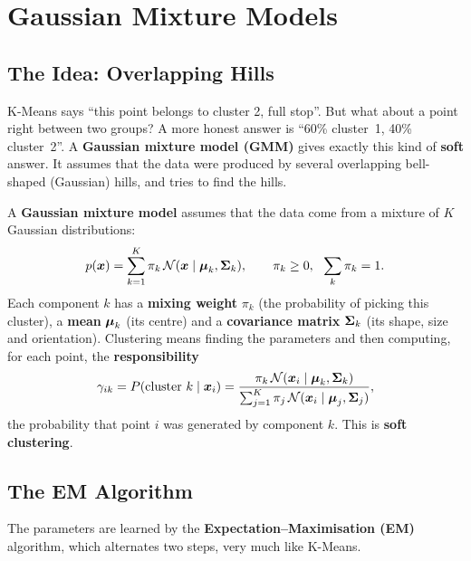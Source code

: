 \section{Gaussian Mixture Models}\label{sec:gmm}

\subsection{The Idea: Overlapping Hills}

K-Means says ``this point belongs to cluster 2, full stop''. But what about a point right between two groups? A more honest answer is ``60\% cluster~1, 40\% cluster~2''. A \textbf{Gaussian mixture model (GMM)} gives exactly this kind of \textbf{soft} answer. It assumes that the data were produced by several overlapping bell-shaped (Gaussian) hills, and tries to find the hills.

\begin{definition}
A \textbf{Gaussian mixture model} assumes that the data come from a mixture of $K$ Gaussian distributions:
\[
  p(\vect x)=\sum_{k=1}^{K}\pi_k\,\mathcal N(\vect x\mid\vect\mu_k,\vect\Sigma_k),\qquad \pi_k\ge0,\ \ \sum_k\pi_k=1.
\]
Each component $k$ has a \textbf{mixing weight} $\pi_k$ (the probability of picking this cluster), a \textbf{mean} $\boldsymbol{\mu}_k$ (its centre) and a \textbf{covariance matrix} $\boldsymbol{\Sigma}_k$ (its shape, size and orientation). Clustering means finding the parameters and then computing, for each point, the \textbf{responsibility}
\[
  \gamma_{ik}=P(\text{cluster }k\mid\boldsymbol{x}_i)=\frac{\pi_k\,\mathcal N(\boldsymbol{x}_i\mid\boldsymbol{\mu}_k,\boldsymbol{\Sigma}_k)}{\sum_{j=1}^{K}\pi_j\,\mathcal N(\boldsymbol{x}_i\mid\boldsymbol{\mu}_j,\boldsymbol{\Sigma}_j)},
\]
the probability that point $i$ was generated by component $k$. This is \textbf{soft clustering}.
\end{definition}

\subsection{The EM Algorithm}

The parameters are learned by the \textbf{Expectation--Maximisation (EM)} algorithm, which alternates two steps, very much like K-Means.

